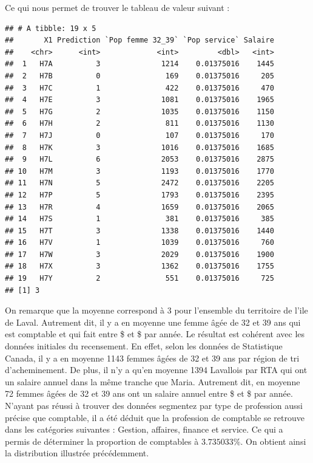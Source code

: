 \documentclass[11pt,french]{article}\usepackage[]{graphicx}\usepackage[]{color}
\makeatletter
\newenvironment{kframe}{%
 \def\at@end@of@kframe{}%
 \ifinner\ifhmode%
  \def\at@end@of@kframe{\end{minipage}}%
  \begin{minipage}{\columnwidth}%
 \fi\fi%
 \def\FrameCommand##1{\hskip\@totalleftmargin \hskip-\fboxsep
 \colorbox{shadecolor}{##1}\hskip-\fboxsep
     \hskip-\linewidth \hskip-\@totalleftmargin \hskip\columnwidth}%
 \MakeFramed {\advance\hsize-\width
   \@totalleftmargin\z@ \linewidth\hsize
   \@setminipage}}%
 {\par\unskip\endMakeFramed%
 \at@end@of@kframe}
\newenvironment{knitrout}{}{} %
\makeatother
\begin{document}
Ce qui nous permet de trouver le tableau de valeur suivant :
\begin{knitrout}
\color{fgcolor}\begin{kframe}
\begin{verbatim}
## # A tibble: 19 x 5
##       X1 Prediction `Pop femme 32_39` `Pop service` Salaire
##    <chr>      <int>             <int>         <dbl>   <int>
##  1   H7A          3              1214    0.01375016    1445
##  2   H7B          0               169    0.01375016     205
##  3   H7C          1               422    0.01375016     470
##  4   H7E          3              1081    0.01375016    1965
##  5   H7G          2              1035    0.01375016    1150
##  6   H7H          2               811    0.01375016    1130
##  7   H7J          0               107    0.01375016     170
##  8   H7K          3              1016    0.01375016    1685
##  9   H7L          6              2053    0.01375016    2875
## 10   H7M          3              1193    0.01375016    1770
## 11   H7N          5              2472    0.01375016    2205
## 12   H7P          5              1793    0.01375016    2395
## 13   H7R          4              1659    0.01375016    2065
## 14   H7S          1               381    0.01375016     385
## 15   H7T          3              1338    0.01375016    1440
## 16   H7V          1              1039    0.01375016     760
## 17   H7W          3              2029    0.01375016    1900
## 18   H7X          3              1362    0.01375016    1755
## 19   H7Y          2               551    0.01375016     725
## [1] 3
\end{verbatim}
\end{kframe}
\end{knitrout}
On remarque que la moyenne correspond à 3 pour l'ensemble du territoire de l'ile de Laval. Autrement dit, il y a en moyenne une femme âgée de 32 et 39 ans qui est comptable et qui fait entre \$ et  \$ par année. Le résultat est cohérent avec les données initiales du recensement. En effet, selon les données de Statistique Canada, il y a en moyenne 1143 femmes âgées de 32 et 39 ans par région de tri d'acheminement. De plus, il n'y a qu'en moyenne 1394 Lavallois par RTA qui ont un salaire annuel dans la même tranche que Maria. Autrement dit, en moyenne 72 femmes âgées de 32 et 39 ans ont un salaire annuel entre \$ et  \$ par année. N'ayant pas réussi à trouver des données segmentez par type de profession aussi précise que comptable, il a été déduit que la profession de comptable se retrouve dans les catégories suivantes : Gestion, affaires, finance et service. Ce qui a permis de déterminer la proportion de comptables à $3.735033 \%$. On obtient ainsi la distribution illustrée précédemment. \newline
\end{document}
